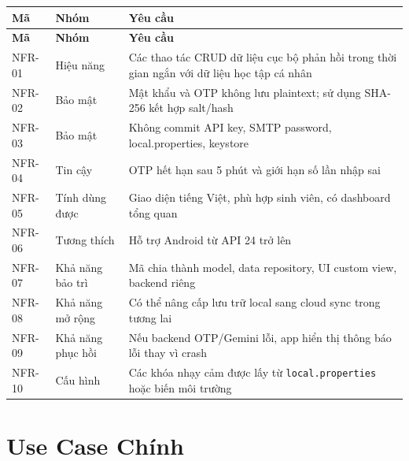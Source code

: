 \documentclass[12pt,a4paper]{report}
\begin{document}
\begin{longtable}{|>{\raggedright\arraybackslash}p{}|>{\raggedright\arraybackslash}p{}|>{\raggedright\arraybackslash}p{}|}
\hline
\textbf{Mã} & \textbf{Nhóm} & \textbf{Yêu cầu} \\ \hline
\endfirsthead
\hline
\textbf{Mã} & \textbf{Nhóm} & \textbf{Yêu cầu} \\ \hline
\endhead
NFR-01 & Hiệu năng & Các thao tác CRUD dữ liệu cục bộ phản hồi trong thời gian ngắn với dữ liệu học tập cá nhân \\ \hline
NFR-02 & Bảo mật & Mật khẩu và OTP không lưu plaintext; sử dụng SHA-256 kết hợp salt/hash \\ \hline
NFR-03 & Bảo mật & Không commit API key, SMTP password, local.properties, keystore \\ \hline
NFR-04 & Tin cậy & OTP hết hạn sau 5 phút và giới hạn số lần nhập sai \\ \hline
NFR-05 & Tính dùng được & Giao diện tiếng Việt, phù hợp sinh viên, có dashboard tổng quan \\ \hline
NFR-06 & Tương thích & Hỗ trợ Android từ API 24 trở lên \\ \hline
NFR-07 & Khả năng bảo trì & Mã chia thành model, data repository, UI custom view, backend riêng \\ \hline
NFR-08 & Khả năng mở rộng & Có thể nâng cấp lưu trữ local sang cloud sync trong tương lai \\ \hline
NFR-09 & Khả năng phục hồi & Nếu backend OTP/Gemini lỗi, app hiển thị thông báo lỗi thay vì crash \\ \hline
NFR-10 & Cấu hình & Các khóa nhạy cảm được lấy từ \texttt{local.properties} hoặc biến môi trường \\ \hline
\end{longtable}

\section{Use Case Chính}
\end{document}
